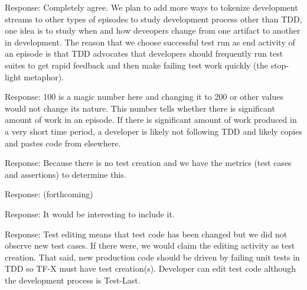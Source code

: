 \documentclass[11pt]{article}
\begin{document}
\noindent Response: Completely agree. We plan to add more ways to tokenize development streams to other types of episodes to study development process 
other than TDD, one idea is to study when and how deveopers change from one artifact to another in development. The reason that we choose successful test run as end activity of an episode is that TDD advocates that developers should frequently run test suites to get rapid feedback and then make failing test work quickly (the stop-light metaphor). 


\noindent Response: 100 is a magic number here and changing it to 200 or other values would not change its nature. This number tells whether there is  significant amount of work in an episode. If there is significant amount of work produced in a very short time period, a developer is likely not following TDD and likely copies and pastes code from elsewhere. 


\noindent Response: Because there is no test creation and we have the metrics
(test cases and assertions) to determine this.


\noindent Response: (forthcoming)


\noindent Response: It would be interesting to include it.


\noindent Response: Test editing means that test code has been changed but we
did not observe new test cases. If there were, we would claim the editing activity as test creation.  That said, new production code should be driven by failing unit tests in TDD so TF-X must have test creation(s). Developer can edit test code although the development process is Test-Last. 
\end{document}
